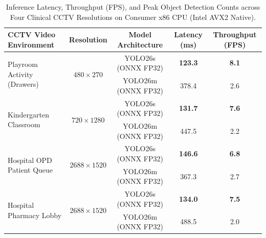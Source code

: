 
\begin{table}[htbp]
\centering
\caption{Inference Latency, Throughput (FPS), and Peak Object Detection Counts across Four Clinical CCTV Resolutions on Consumer x86 CPU (Intel AVX2 Native).}
\label{tab:hardware_benchmark}
\small
\begin{tabular}{lcccc}
\toprule
\textbf{CCTV Video Environment} & \textbf{Resolution} & \textbf{Model Architecture} & \textbf{Latency (ms)} & \textbf{Throughput (FPS)} \\
\midrule
\multirow{2}{*}{Playroom Activity (Drawers)} & \multirow{2}{*}{$480 \times 270$} & YOLO26s (ONNX FP32) & \textbf{123.3} & \textbf{8.1} \\
 & & YOLO26m (ONNX FP32) & 378.4 & 2.6 \\
\midrule
\multirow{2}{*}{Kindergarten Classroom} & \multirow{2}{*}{$720 \times 1280$} & YOLO26s (ONNX FP32) & \textbf{131.7} & \textbf{7.6} \\
 & & YOLO26m (ONNX FP32) & 447.5 & 2.2 \\
\midrule
\multirow{2}{*}{Hospital OPD Patient Queue} & \multirow{2}{*}{$2688 \times 1520$} & YOLO26s (ONNX FP32) & \textbf{146.6} & \textbf{6.8} \\
 & & YOLO26m (ONNX FP32) & 367.3 & 2.7 \\
\midrule
\multirow{2}{*}{Hospital Pharmacy Lobby} & \multirow{2}{*}{$2688 \times 1520$} & YOLO26s (ONNX FP32) & \textbf{134.0} & \textbf{7.5} \\
 & & YOLO26m (ONNX FP32) & 488.5 & 2.0 \\
\bottomrule
\end{tabular}
\end{table}

